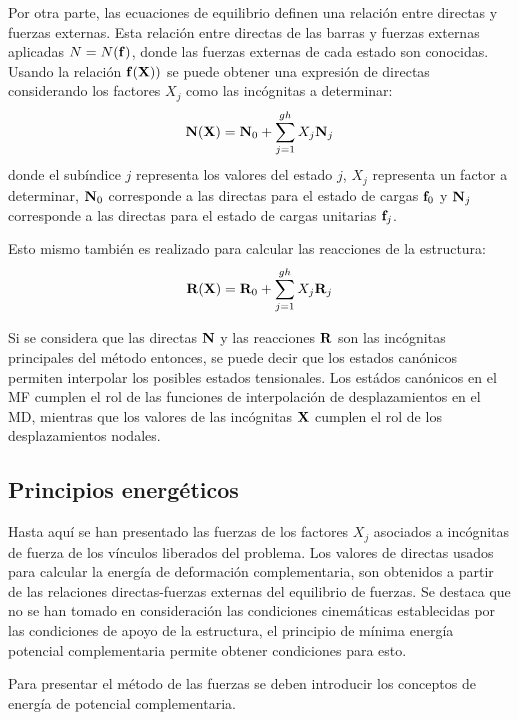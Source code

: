 Por otra parte, las ecuaciones de equilibrio definen una relación entre directas y fuerzas externas. %
Esta relación entre directas de las barras y fuerzas externas aplicadas $N=N({\bf f})$, donde las fuerzas externas de cada estado son conocidas. %
%
Usando la relación ${\bf f}({\bf X}))$ se puede obtener una expresión de directas considerando los factores $X_j$ como las incógnitas a determinar:
%
\begin{equation}\label{eqn:estadosdirectas}
\textbf{N}({\bf X}) = \textbf{N}_0 + \sum_{j=1}^{gh} X_j \textbf{N}_j
\end{equation}
%
donde el subíndice $j$ representa los valores del estado $j$, $X_j$ representa un factor a determinar, ${\bf N}_0$ corresponde a las directas para el estado de cargas ${\bf f}_0$ y ${\bf N}_j$ corresponde a las directas para el estado de cargas unitarias ${\bf f}_j$.
%


Esto mismo también es realizado para calcular las reacciones de la estructura:
%
\begin{equation}
\textbf{R}({\bf X}) = \textbf{R}_0 + \sum_{j=1}^{gh} X_j \textbf{R}_j
\end{equation}

Si se considera que las directas ${\bf N}$ y las reacciones ${\bf R}$ son las incógnitas principales del método entonces, se puede decir que los estados canónicos permiten interpolar los posibles estados tensionales. Los estádos canónicos en el MF cumplen el rol de las funciones de interpolación de desplazamientos en el MD, mientras que los valores de las incógnitas ${\bf X}$ cumplen el rol de los desplazamientos nodales.

\subsection{Principios energéticos}

Hasta aquí se han presentado las fuerzas de los factores $X_j$ asociados a incógnitas de fuerza de los vínculos liberados del problema. %
%
Los valores de directas usados para calcular la energía de deformación complementaria, son obtenidos a partir de las relaciones directas-fuerzas externas del equilibrio de fuerzas. %
%
Se destaca que no se han tomado en consideración las condiciones cinemáticas establecidas por las condiciones de apoyo de la estructura, el principio de mínima energía potencial complementaria permite obtener condiciones para esto.


Para presentar el método de las fuerzas se deben introducir los conceptos de energía de potencial complementaria. %

